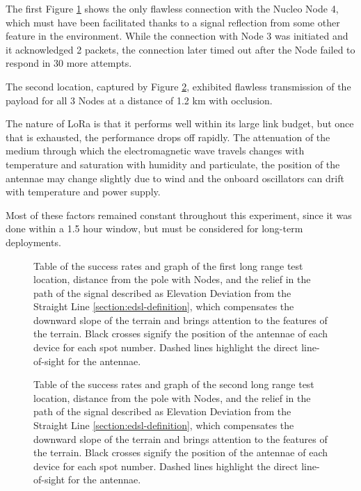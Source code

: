 The first Figure \ref{fig:range-relief-far1} shows the only flawless connection with the Nucleo Node 4, which must have been facilitated thanks to a signal reflection from some other feature in the environment. While the connection with Node 3 was initiated and it acknowledged 2 packets, the connection later timed out after the Node failed to respond in 30 more attempts.

The second location, captured by Figure \ref{fig:range-relief-far2}, exhibited flawless transmission of the payload for all 3 Nodes at a distance of 1.2 km with occlusion.

The nature of LoRa is that it performs well within its large link budget, but once that is exhausted, the performance drops off rapidly. The attenuation of the medium through which the electromagnetic wave travels changes with temperature and saturation with humidity and particulate, the position of the antennae may change slightly due to wind and the onboard oscillators can drift with temperature and power supply.

Most of these factors remained constant throughout this experiment, since it was done within a 1.5 hour window, but must be considered for long-term deployments.

\begin{figure}[p]
    \centering
    \begin{minipage}[t]{\textwidth}
        \centering
        
        \vspace{1em}
    \end{minipage}
    
    \caption{\label{fig:range-relief-far1}Table of the success rates and graph of the first long range test location, distance from the pole with Nodes, and the relief in the path of the signal described as Elevation Deviation from the Straight Line \ref{section:edsl-definition}, which compensates the downward slope of the terrain and brings attention to the features of the terrain. Black crosses signify the position of the antennae of each device for each spot number. Dashed lines highlight the direct line-of-sight for the antennae.}
\end{figure}

\begin{figure}[p]
    \centering
    \begin{minipage}[t]{\textwidth}
        \centering
        
        \vspace{1em}
    \end{minipage}
    
    \caption{\label{fig:range-relief-far2}Table of the success rates and graph of the second long range test location, distance from the pole with Nodes, and the relief in the path of the signal described as Elevation Deviation from the Straight Line \ref{section:edsl-definition}, which compensates the downward slope of the terrain and brings attention to the features of the terrain. Black crosses signify the position of the antennae of each device for each spot number. Dashed lines highlight the direct line-of-sight for the antennae.}
\end{figure}

